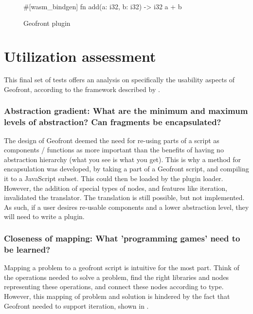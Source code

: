 \begin{figure}
\centering
\begin{code}
#[wasm_bindgen]
fn add(a: i32, b: i32) -> i32 {
    a + b
}
\end{code}
\caption[]{Geofront plugin}
\label{fig:boilerplate:geofront}
\end{figure}


\section{Utilization assessment}
\label{sec:testing:usability}

This final set of tests offers an analysis on specifically the usability aspects of Geofront, according to the framework described by \citet{green_usability_1996}.

\subsubsection*{Abstraction gradient: What are the minimum and maximum levels of abstraction? Can fragments be encapsulated?}
 
The design of Geofront deemed the need for re-using parts of a script as components / functions as more important than the benefits of having no abstraction hierarchy (what you see is what you get).
This is why a method for encapsulation was developed, by taking a part of a Geofront script, and compiling it to a JavaScript subset. This could then be loaded by the plugin loader. 
However, the addition of special types of nodes, and features like iteration, invalidated the  translator.
The translation is still possible, but not implemented.  
As such, if a user desires re-usable components and a lower abstraction level, they will need to write a plugin.


\subsubsection*{Closeness of mapping: What 'programming games' need to be learned?}

Mapping a problem to a geofront script is intuitive for the most part.
Think of the operations needed to solve a problem, 
find the right libraries and nodes representing these operations,
and connect these nodes according to type. 
However, this mapping of problem and solution is hindered by the fact that Geofront needed to support iteration, shown in . 

